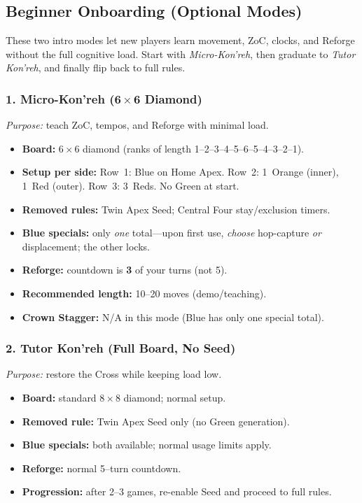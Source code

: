 \documentclass[11pt]{article}
\begin{document}
\clearpage
\subsection{Beginner Onboarding (Optional Modes)}
\label{sec:onboarding}

\noindent These two intro modes let new players learn movement, ZoC, clocks, and Reforge without the full cognitive load. Start with \emph{Micro-Kon'reh}, then graduate to \emph{Tutor Kon'reh}, and finally flip back to full rules.

\subsubsection*{1. Micro-Kon'reh (6\,$\times$\,6 Diamond)}
\textit{Purpose:} teach ZoC, tempos, and Reforge with minimal load.
\begin{itemize}[leftmargin=1.3em]
  \item \textbf{Board:} 6\,$\times$\,6 diamond (ranks of length 1--2--3--4--5--6--5--4--3--2--1).
  \item \textbf{Setup per side:} Row~1: Blue on Home Apex. Row~2: 1~Orange (inner), 1~Red (outer). Row~3: 3~Reds. No Green at start.
  \item \textbf{Removed rules:} Twin Apex Seed; Central Four stay/exclusion timers.
  \item \textbf{Blue specials:} only \emph{one} total---upon first use, \emph{choose} hop-capture \emph{or} displacement; the other locks.
  \item \textbf{Reforge:} countdown is \textbf{3} of your turns (not 5).
  \item \textbf{Recommended length:} 10--20 moves (demo/teaching).
  \item \textbf{Crown Stagger:} \textsc{N/A} in this mode (Blue has only one special total).
\end{itemize}

\subsubsection*{2. Tutor Kon'reh (Full Board, No Seed)}
\textit{Purpose:} restore the Cross while keeping load low.
\begin{itemize}[leftmargin=1.3em]
  \item \textbf{Board:} standard 8\,$\times$\,8 diamond; normal setup.
  \item \textbf{Removed rule:} Twin Apex Seed only (no Green generation).
  \item \textbf{Blue specials:} both available; normal usage limits apply.
  \item \textbf{Reforge:} normal 5--turn countdown.
  \item \textbf{Progression:} after 2--3 games, re-enable Seed and proceed to full rules.
\end{itemize}
\end{document}
